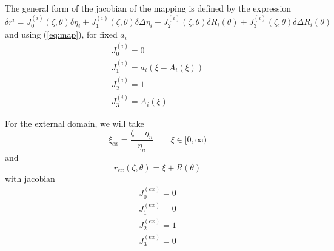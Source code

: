 The general form of the jacobian of the mapping is defined by the expression
\begin{equation}
\delta r^{i}=J_0^{(i)}(\zeta,\theta)\delta\eta_i+J_1^{(i)}(\zeta,\theta)\delta\Delta\eta_i
+J_2^{(i)}(\zeta,\theta)\delta R_i(\theta)+J_3^{(i)}(\zeta,\theta)\delta\Delta R_i(\theta)
\end{equation}
and using (\ref{eq:map}), for fixed $a_i$
\begin{equation}
\begin{array}{l}
J_0^{(i)}=0\\
J_1^{(i)}=a_i(\xi-A_i(\xi))\\
J_2^{(i)}=1\\
J_3^{(i)}=A_i(\xi)
\end{array}
\end{equation}

For the external domain, we will take 
\begin{equation}
\xi_{ex}=\frac{\zeta-\eta_n}{\eta_n} \qquad \xi\in[0,\infty)
\end{equation}
and
\begin{equation}
r_{ex}(\zeta,\theta)=\xi+R(\theta)
\end{equation}
with jacobian
\begin{equation}
\begin{array}{l}
J_0^{(ex)}=0\\
J_1^{(ex)}=0\\
J_2^{(ex)}=1\\
J_3^{(ex)}=0
\end{array}
\end{equation}


